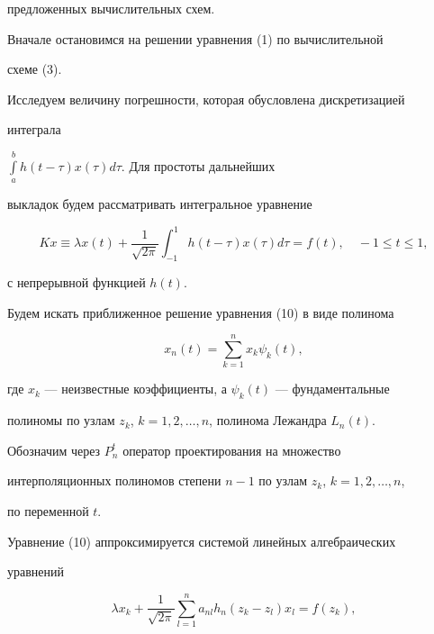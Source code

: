 предложенных вычислительных схем.





Вначале остановимся на решении уравнения (1) по вычислительной


схеме (3).


Исследуем величину погрешности, которая обусловлена дискретизацией


интеграла 


$\int\limits_a^b h(t-\tau) x(\tau) d\tau$. Для простоты дальнейших


выкладок будем рассматривать интегральное уравнение


\begin{equation}


Kx\equiv\lambda x(t)+\frac{1}{\sqrt{2\pi}}


\int_{-1}^1 h(t-\tau) x(\tau) d\tau=f(t),


\quad -1\le t\le 1,


\end{equation}


с непрерывной функцией $ h(t)$.





Будем искать приближенное решение уравнения (10) в виде полинома


$$


x_n(t)=\sum_{k=1}^ n x_k\psi_k(t),


$$


где $x_k$ --- неизвестные коэффициенты, а $ \psi_k(t)$ --- фундаментальные


полиномы по узлам $z_k$, $k=1,2,\dotsc,n$, полинома Лежандра $ L_n(t)$.


Обозначим через $P_n^t$ оператор проектирования на множество


интерполяционных полиномов степени $n-1$ по узлам $z_k$, $k=1,2,\dotsc,n$,


по переменной $t$.





Уравнение (10) аппроксимируется системой линейных алгебраических


уравнений


\begin{equation}


\lambda x_k+\frac{1}{\sqrt{2\pi}}\sum_{l=1}^n


a_{nl} h_n(z_k-z_l) x_l=f(z_k),


\end{equation}


